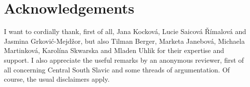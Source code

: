 \documentclass[output=paper,colorlinks,citecolor=brown]{langscibook}
\begin{document}





\section*{Acknowledgements}
I want to cordially thank, first of all, Jana Kocková, Lucie Saicová Římalová and Jasmina Grković-Mejdžor, but also Tilman Berger, Marketa Janebová, Michaela Martinková, Karolína Skwarska and Mladen Uhlik for their expertise and support. I also appreciate the useful remarks by an anonymous reviewer, first of all concerning Central South Slavic and some threads of argumentation. Of course, the usual disclaimers apply.


\sloppy
\printbibliography[heading=subbibliography,notkeyword=this]
\end{document}

